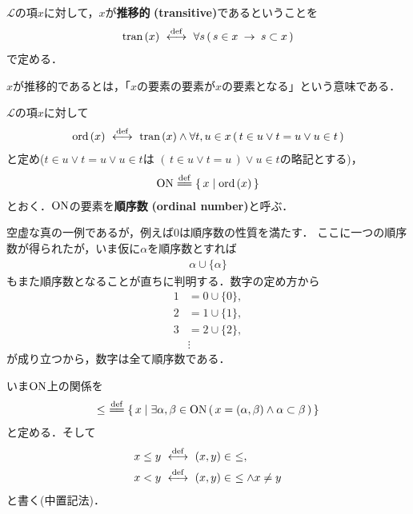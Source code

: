 	\begin{screen}
		\begin{dfn}[推移的類]
			$\mathcal{L}$の項$x$に対して，$x$が{\bf 推移的}
			{\bf (transitive)}であるということを
			\begin{align}
				\operatorname*{tran}\hspace{0.15em}(x) \ \overset{\mathrm{def}}{\longleftrightarrow}\ 
				\forall s\, (\, s \in x \hspace{0.25em}\rightarrow\hspace{0.25em} s \subset x\, )
			\end{align}
			で定める．
		\end{dfn}
	\end{screen}
	
	$x$が推移的であるとは，「$x$の要素の要素が$x$の要素となる」という意味である．
	
	\begin{screen}
		\begin{dfn}[順序数]
			$\mathcal{L}$の項$x$に対して
			\begin{align}
				\operatorname*{ord}\hspace{0.15em}(x) \ \overset{\mathrm{def}}{\longleftrightarrow}\  \operatorname*{tran}\hspace{0.15em}(x) \wedge 
				\forall t,u \in x\, (\, t \in u \vee t = u \vee u \in t\, )
			\end{align}
			と定め($t \in u \vee t = u \vee u \in t$は
			$(\, t \in u \vee t = u\, ) \vee u \in t$の略記とする)，
			\begin{align}
				\ON \defeq \Set{x}{\ord{x}}
			\end{align}
			とおく．$\mathrm{ON}$の要素を{\bf 順序数}\index{じゅんじょすう@順序数}
			{\bf (ordinal number)}と呼ぶ．
		\end{dfn}
	\end{screen}
	
	空虚な真の一例であるが，例えば$0$は順序数の性質を満たす．
	ここに一つの順序数が得られたが，いま仮に$\alpha$を順序数とすれば
	\begin{align}
		\alpha \cup \{\alpha\}
	\end{align}
	もまた順序数となることが直ちに判明する．数字の定め方から
	\begin{align}
		1 &= 0 \cup \{0\}, \\
		2 &= 1 \cup \{1\}, \\
		3 &= 2 \cup \{2\}, \\
		&\vdots
	\end{align}
	が成り立つから，数字は全て順序数である．
	
	いま$\mathrm{ON}$上の関係を
	\begin{align}
		\leq\ \defeq \Set{x}{\exists \alpha,\beta \in \ON\, 
		(\, x=(\alpha,\beta) \wedge \alpha \subset \beta\, )}
	\end{align}
	と定める．そして
	\begin{align}
		x \leq y &\ \overset{\mathrm{def}}{\longleftrightarrow}\  (x,y) \in\ \leq, \\
		x < y &\ \overset{\mathrm{def}}{\longleftrightarrow}\  (x,y) \in\ \leq \wedge x \neq y
	\end{align}
	と書く(中置記法)．
	
